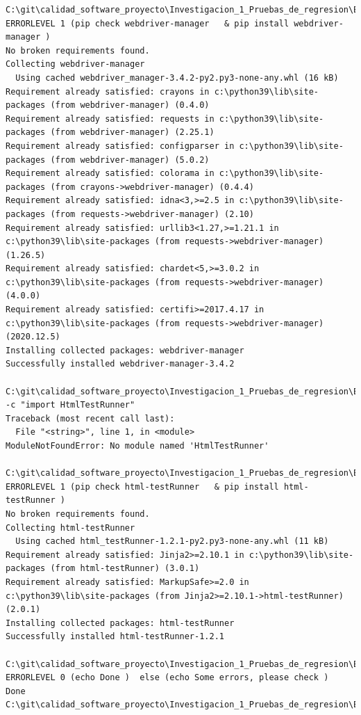 \documentclass[conference]{IEEEtran}
\begin{document}
\begin{lstlisting}[style=CMD]
C:\git\calidad_software_proyecto\Investigacion_1_Pruebas_de_regresion\Ejemplo_Practico>if ERRORLEVEL 1 (pip check webdriver-manager   & pip install webdriver-manager )
No broken requirements found.
Collecting webdriver-manager
  Using cached webdriver_manager-3.4.2-py2.py3-none-any.whl (16 kB)
Requirement already satisfied: crayons in c:\python39\lib\site-packages (from webdriver-manager) (0.4.0)
Requirement already satisfied: requests in c:\python39\lib\site-packages (from webdriver-manager) (2.25.1)
Requirement already satisfied: configparser in c:\python39\lib\site-packages (from webdriver-manager) (5.0.2)
Requirement already satisfied: colorama in c:\python39\lib\site-packages (from crayons->webdriver-manager) (0.4.4)
Requirement already satisfied: idna<3,>=2.5 in c:\python39\lib\site-packages (from requests->webdriver-manager) (2.10)
Requirement already satisfied: urllib3<1.27,>=1.21.1 in c:\python39\lib\site-packages (from requests->webdriver-manager) (1.26.5)
Requirement already satisfied: chardet<5,>=3.0.2 in c:\python39\lib\site-packages (from requests->webdriver-manager) (4.0.0)
Requirement already satisfied: certifi>=2017.4.17 in c:\python39\lib\site-packages (from requests->webdriver-manager) (2020.12.5)
Installing collected packages: webdriver-manager
Successfully installed webdriver-manager-3.4.2

C:\git\calidad_software_proyecto\Investigacion_1_Pruebas_de_regresion\Ejemplo_Practico>python -c "import HtmlTestRunner"
Traceback (most recent call last):
  File "<string>", line 1, in <module>
ModuleNotFoundError: No module named 'HtmlTestRunner'

C:\git\calidad_software_proyecto\Investigacion_1_Pruebas_de_regresion\Ejemplo_Practico>if ERRORLEVEL 1 (pip check html-testRunner   & pip install html-testRunner )
No broken requirements found.
Collecting html-testRunner
  Using cached html_testRunner-1.2.1-py2.py3-none-any.whl (11 kB)
Requirement already satisfied: Jinja2>=2.10.1 in c:\python39\lib\site-packages (from html-testRunner) (3.0.1)
Requirement already satisfied: MarkupSafe>=2.0 in c:\python39\lib\site-packages (from Jinja2>=2.10.1->html-testRunner) (2.0.1)
Installing collected packages: html-testRunner
Successfully installed html-testRunner-1.2.1

C:\git\calidad_software_proyecto\Investigacion_1_Pruebas_de_regresion\Ejemplo_Practico>if ERRORLEVEL 0 (echo Done )  else (echo Some errors, please check )
Done
C:\git\calidad_software_proyecto\Investigacion_1_Pruebas_de_regresion\Ejemplo_Practico>


\end{lstlisting}
\end{document}
